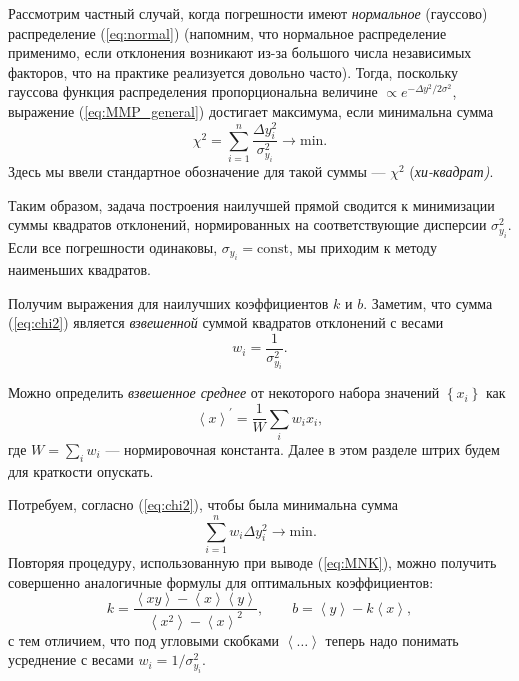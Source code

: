 \documentclass[10pt]{article}
\begin{document}
Рассмотрим частный случай, когда погрешности имеют \emph{нормальное}
(гауссово) распределение (\ref{eq:normal}) (напомним, что нормальное
распределение применимо, если отклонения возникают из-за большого
числа независимых факторов, что на практике реализуется довольно часто).
Тогда, поскольку гауссова функция распределения пропорциональна величине
$\propto e^{-\Delta y^{2}/2\sigma^{2}}$, выражение (\ref{eq:MMP_general})
достигает максимума, если минимальна сумма
\begin{equation}
\boxed{\chi^{2}=\sum_{i=1}^{n}\frac{\Delta y_{i}^{2}}{\sigma_{y_{i}}^{2}}\to\mathrm{min}}.\label{eq:chi2}
\end{equation}
Здесь мы ввели стандартное обозначение для такой суммы ---
$\chi^{2}$ (\emph{хи-квадрат)}.

Таким образом, задача построения наилучшей прямой сводится
к минимизации суммы квадратов отклонений, нормированных на соответствующие
дисперсии $\sigma_{y_{i}}^{2}$. Если все погрешности одинаковы, $\sigma_{y_{i}}=\mathrm{const}$,
мы приходим к методу наименьших квадратов.

Получим выражения для наилучших коэффициентов $k$ и $b$.
Заметим, что сумма (\ref{eq:chi2}) является \emph{взвешенной}
суммой квадратов отклонений с весами
\begin{equation}
w_{i}=\frac{1}{\sigma_{y_{i}}^{2}}.
\end{equation}

Можно определить \emph{взвешенное среднее} от
некоторого набора значений $\left\{ x_{i}\right\}$ как
\[
\left\langle x\right\rangle ^{\prime}=\frac{1}{W}\sum_{i}w_{i}x_{i},
\]
где $W=\sum\limits _{i}w_{i}$ --- нормировочная константа.
Далее в этом разделе штрих будем для краткости опускать.

Потребуем, согласно (\ref{eq:chi2}), чтобы была минимальна
сумма
\[
\sum\limits _{i=1}^{n}w_{i}\Delta y_{i}^{2}\to\mathrm{min}.
\]
Повторяя процедуру, использованную при выводе (\ref{eq:MNK}), можно
получить совершенно аналогичные формулы для оптимальных коэффициентов:
\begin{equation}
\boxed{k=\frac{\left\langle xy\right\rangle -\left\langle x\right\rangle \left\langle y\right\rangle }{\left\langle x^{2}\right\rangle -\left\langle x\right\rangle ^{2}},\qquad b=\left\langle y\right\rangle -k\left\langle x\right\rangle },\label{eq:MMP}
\end{equation}
с тем отличием, что под угловыми скобками $\left\langle \ldots\right\rangle $
теперь надо понимать усреднение с весами $w_{i}=1/\sigma_{y_{i}}^{2}$.
\end{document}
